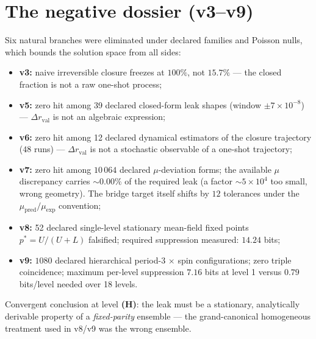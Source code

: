 \documentclass[11pt,a4paper]{article}
\newcommand{\Dr}{\Delta r_{\mathrm{val}}}
\begin{document}
\section{The negative dossier (v3--v9)}
Six natural branches were eliminated under declared families and Poisson nulls, which bounds the solution space from all sides:
\begin{itemize}[leftmargin=1.6em]
\item \textbf{v3:} naive irreversible closure freezes at $100\%$, not $15.7\%$ --- the closed fraction is not a raw one-shot process;
\item \textbf{v5:} zero hit among 39 declared closed-form leak shapes (window $\pm 7\times10^{-8}$) --- $\Dr$ is not an algebraic expression;
\item \textbf{v6:} zero hit among 12 declared dynamical estimators of the closure trajectory ($48$ runs) --- $\Dr$ is not a stochastic observable of a one-shot trajectory;
\item \textbf{v7:} zero hit among $10\,064$ declared $\mu$-deviation forms; the available $\mu$ discrepancy carries $\sim 0.00\%$ of the required leak (a factor $\sim 5\times10^{4}$ too small, wrong geometry). The bridge target itself shifts by $12$ tolerances under the $\mu_{\mathrm{pred}}/\mu_{\mathrm{exp}}$ convention;
\item \textbf{v8:} 52 declared single-level stationary mean-field fixed points $p^* = U/(U+L)$ falsified; required suppression measured: $14.24$ bits;
\item \textbf{v9:} $1080$ declared hierarchical period-3 $\times$ spin configurations; zero triple coincidence; maximum per-level suppression $7.16$ bits at level 1 versus $0.79$ bits/level needed over 18 levels.
\end{itemize}
Convergent conclusion at level \textbf{(H)}: the leak must be a stationary, analytically derivable property of a \emph{fixed-parity} ensemble --- the grand-canonical homogeneous treatment used in v8/v9 was the wrong ensemble.
\end{document}
